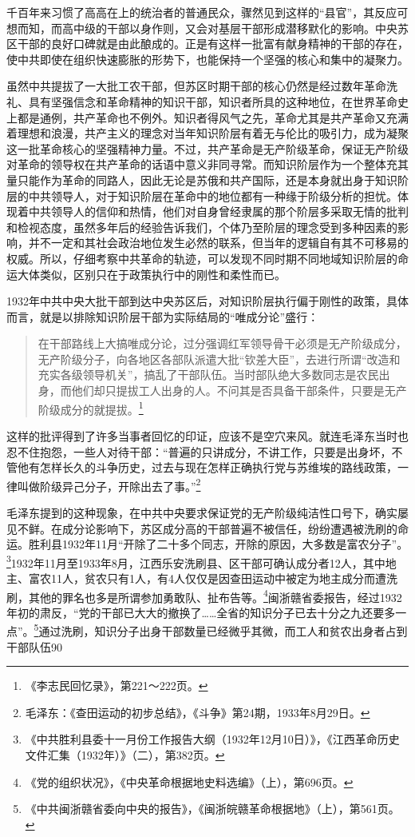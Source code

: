 千百年来习惯了高高在上的统治者的普通民众，骤然见到这样的“县官”，其反应可想而知，而高中级的干部以身作则，又会对基层干部形成潜移默化的影响。中央苏区干部的良好口碑就是由此酿成的。正是有这样一批富有献身精神的干部的存在，使中共即使在组织快速膨胀的形势下，也能保持一个坚强的核心和集中的凝聚力。


虽然中共提拔了一大批工农干部，但苏区时期干部的核心仍然是经过数年革命洗礼、具有坚强信念和革命精神的知识干部，知识者所具的这种地位，在世界革命史上都是通例，共产革命也不例外。知识者得风气之先，革命尤其是共产革命又充满着理想和浪漫，共产主义的理念对当年知识阶层有着无与伦比的吸引力，成为凝聚这一批革命核心的坚强精神力量。不过，共产革命是无产阶级革命，保证无产阶级对革命的领导权在共产革命的话语中意义非同寻常。而知识阶层作为一个整体充其量只能作为革命的同路人，因此无论是苏俄和共产国际，还是本身就出身于知识阶层的中共领导人，对于知识阶层在革命中的地位都有一种缘于阶级分析的担忧。体现着中共领导人的信仰和热情，他们对自身曾经隶属的那个阶层多采取无情的批判和检视态度，虽然多年后的经验告诉我们，个体乃至阶层的理念受到多种因素的影响，并不一定和其社会政治地位发生必然的联系，但当年的逻辑自有其不可移易的权威。所以，仔细考察中共革命的轨迹，可以发现不同时期不同地域知识阶层的命运大体类似，区别只在于政策执行中的刚性和柔性而已。


1932年中共中央大批干部到达中央苏区后，对知识阶层执行偏于刚性的政策，具体而言，就是以排除知识阶层干部为实际结局的“唯成分论”盛行：

\begin{quote}

在干部路线上大搞唯成分论，过分强调红军领导骨干必须是无产阶级成分，无产阶级分子，向各地区各部队派遣大批“钦差大臣”，去进行所谓“改造和充实各级领导机关”，搞乱了干部队伍。当时部队绝大多数同志是农民出身，而他们却只提拔工人出身的人。不问其是否具备干部条件，只要是无产阶级成分的就提拔。\footnote{《李志民回忆录》，第221～222页。}
\end{quote}


这样的批评得到了许多当事者回忆的印证，应该不是空穴来风。就连毛泽东当时也忍不住抱怨，一些人对待干部：“普遍的只讲成分，不讲工作，只要是出身坏，不管他有怎样长久的斗争历史，过去与现在怎样正确执行党与苏维埃的路线政策，一律叫做阶级异己分子，开除出去了事。”\footnote{毛泽东：《查田运动的初步总结》，《斗争》第24期，1933年8月29日。}


毛泽东提到的这种现象，在中共中央要求保证党的无产阶级纯洁性口号下，确实屡见不鲜。在成分论影响下，苏区成分高的干部普遍不被信任，纷纷遭遇被洗刷的命运。胜利县1932年11月“开除了二十多个同志，开除的原因，大多数是富农分子”。\footnote{《中共胜利县委十一月份工作报告大纲（1932年12月10日）》，《江西革命历史文件汇集（1932年）》（二），第382页。}1932年11月至1933年8月，江西乐安洗刷县、区干部可确认成分者12人，其中地主、富农11人，贫农只有1人，有4人仅仅是因查田运动中被定为地主成分而遭洗刷，其他的罪名也多是所谓参加勇敢队、扯布告等。\footnote{《党的组织状况》，《中央革命根据地史料选编》（上），第696页。}闽浙赣省委报告，经过1932年初的肃反，“党的干部已大大的撤换了……全省的知识分子已去十分之九还要多一点”。\footnote{《中共闽浙赣省委向中央的报告》，《闽浙皖赣革命根据地》（上），第561页。}通过洗刷，知识分子出身干部数量已经微乎其微，而工人和贫农出身者占到干部队伍90%


